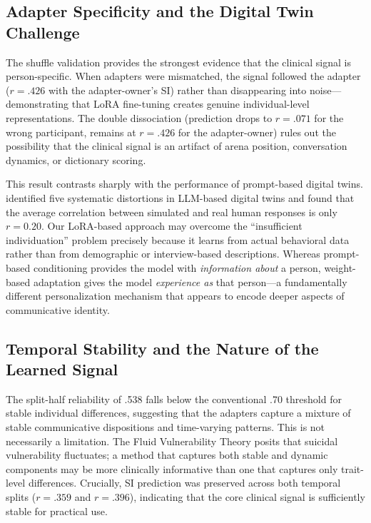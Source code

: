 \documentclass[review,12pt,authoryear]{elsarticle}
\begin{document}
\subsection{Adapter Specificity and the Digital Twin Challenge}

The shuffle validation provides the strongest evidence that the clinical signal is person-specific. When adapters were mismatched, the signal followed the adapter ($r = .426$ with the adapter-owner's SI) rather than disappearing into noise---demonstrating that LoRA fine-tuning creates genuine individual-level representations. The double dissociation (prediction drops to $r = .071$ for the wrong participant, remains at $r = .426$ for the adapter-owner) rules out the possibility that the clinical signal is an artifact of arena position, conversation dynamics, or dictionary scoring.

This result contrasts sharply with the performance of prompt-based digital twins. \citet{peng2025funhouse} identified five systematic distortions in LLM-based digital twins and found that the average correlation between simulated and real human responses is only $r = 0.20$. Our LoRA-based approach may overcome the ``insufficient individuation'' problem precisely because it learns from actual behavioral data rather than from demographic or interview-based descriptions. Whereas prompt-based conditioning provides the model with \textit{information about} a person, weight-based adaptation gives the model \textit{experience as} that person---a fundamentally different personalization mechanism that appears to encode deeper aspects of communicative identity.

\subsection{Temporal Stability and the Nature of the Learned Signal}

The split-half reliability of .538 falls below the conventional .70 threshold for stable individual differences, suggesting that the adapters capture a mixture of stable communicative dispositions and time-varying patterns. This is not necessarily a limitation. The Fluid Vulnerability Theory \citep{bryan2018nonlinear} posits that suicidal vulnerability fluctuates; a method that captures both stable and dynamic components may be more clinically informative than one that captures only trait-level differences. Crucially, SI prediction was preserved across both temporal splits ($r = .359$ and $r = .396$), indicating that the core clinical signal is sufficiently stable for practical use.
\end{document}
